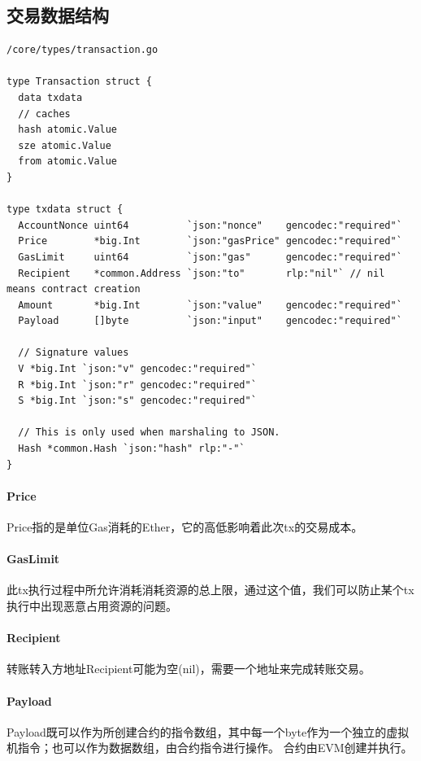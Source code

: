 \documentclass[UTF8]{ctexart}
\begin{document}
\subsection{交易数据结构}

\begin{lstlisting}
/core/types/transaction.go

type Transaction struct {
  data txdata
  // caches
  hash atomic.Value
  sze atomic.Value
  from atomic.Value
}

type txdata struct {
  AccountNonce uint64          `json:"nonce"    gencodec:"required"`
  Price        *big.Int        `json:"gasPrice" gencodec:"required"`
  GasLimit     uint64          `json:"gas"      gencodec:"required"`
  Recipient    *common.Address `json:"to"       rlp:"nil"` // nil means contract creation
  Amount       *big.Int        `json:"value"    gencodec:"required"`
  Payload      []byte          `json:"input"    gencodec:"required"`

  // Signature values
  V *big.Int `json:"v" gencodec:"required"`
  R *big.Int `json:"r" gencodec:"required"`
  S *big.Int `json:"s" gencodec:"required"`

  // This is only used when marshaling to JSON.
  Hash *common.Hash `json:"hash" rlp:"-"`
}

\end{lstlisting}

\paragraph{Price}
Price指的是单位Gas消耗的Ether，它的高低影响着此次tx的交易成本。

\paragraph{GasLimit}
此tx执行过程中所允许消耗消耗资源的总上限，通过这个值，我们可以防止某个tx执行中出现恶意占用资源的问题。

\paragraph{Recipient}
转账转入方地址Recipient可能为空(nil)，需要一个地址来完成转账交易。

\paragraph{Payload}
Payload既可以作为所创建合约的指令数组，其中每一个byte作为一个独立的虚拟机指令；也可以作为数据数组，由合约指令进行操作。
合约由EVM创建并执行。
\end{document}
